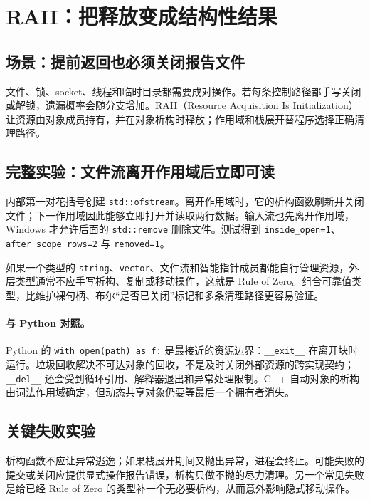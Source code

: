 \section{RAII：把释放变成结构性结果}

\subsection{场景：提前返回也必须关闭报告文件}

文件、锁、socket、线程和临时目录都需要成对操作。若每条控制路径都手写关闭或解锁，遗漏概率会随分支增加。RAII（Resource Acquisition Is Initialization）让资源由对象成员持有，并在对象析构时释放；作用域和栈展开替程序选择正确清理路径。

\subsection{完整实验：文件流离开作用域后立即可读}



内部第一对花括号创建 \texttt{std::ofstream}。离开作用域时，它的析构函数刷新并关闭文件；下一作用域因此能够立即打开并读取两行数据。输入流也先离开作用域，Windows 才允许后面的 \texttt{std::remove} 删除文件。测试得到 \texttt{inside\_open=1}、\texttt{after\_scope\_rows=2} 与 \texttt{removed=1}。

如果一个类型的 \texttt{string}、\texttt{vector}、文件流和智能指针成员都能自行管理资源，外层类型通常不应手写析构、复制或移动操作，这就是 Rule of Zero。组合可靠值类型，比维护裸句柄、布尔“是否已关闭”标记和多条清理路径更容易验证。

\paragraph{与 Python 对照。}
Python 的 \texttt{with open(path) as f:} 是最接近的资源边界：\texttt{\_\_exit\_\_} 在离开块时运行。垃圾回收解决不可达对象的回收，不是及时关闭外部资源的跨实现契约；\texttt{\_\_del\_\_} 还会受到循环引用、解释器退出和异常处理限制。C++ 自动对象的析构由词法作用域确定，但动态共享对象仍要等最后一个拥有者消失。

\subsection{关键失败实验}

析构函数不应让异常逃逸；如果栈展开期间又抛出异常，进程会终止。可能失败的提交或关闭应提供显式操作报告错误，析构只做不抛的尽力清理。另一个常见失败是给已经 Rule of Zero 的类型补一个无必要析构，从而意外影响隐式移动操作。

